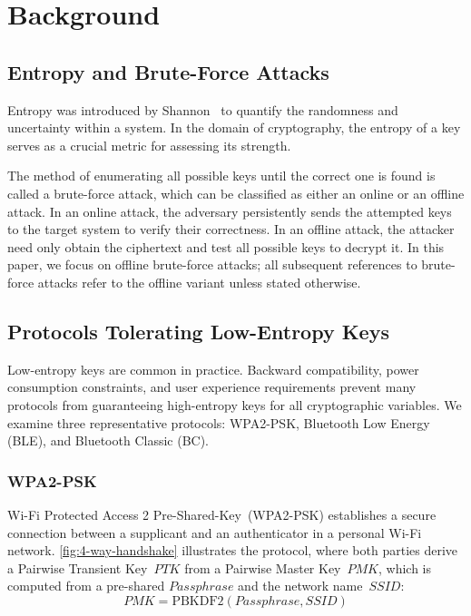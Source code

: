 \section{Background} \label{sec:2background}

\subsection{Entropy and Brute-Force Attacks}

Entropy was introduced by Shannon~\cite{shannon1948communicationtheory} to quantify the randomness and uncertainty within a system.
In the domain of cryptography, the entropy of a key serves as a crucial metric for assessing its strength.

The method of enumerating all possible keys until the correct one is found is called a brute-force attack, which can be classified as either an online or an offline attack.
In an online attack, the adversary persistently sends the attempted keys to the target system to verify their correctness.
In an offline attack, the attacker need only obtain the ciphertext and test all possible keys to decrypt it.
In this paper, we focus on offline brute-force attacks; all subsequent references to brute-force attacks refer to the offline variant unless stated otherwise.

\subsection{Protocols Tolerating Low-Entropy Keys}
Low-entropy keys are common in practice.
Backward compatibility, power consumption constraints, and user experience requirements prevent many protocols from guaranteeing high-entropy keys for all cryptographic variables.
We examine three representative protocols: WPA2-PSK, Bluetooth Low Energy (BLE), and Bluetooth Classic (BC).

\subsubsection{WPA2-PSK}
Wi-Fi Protected Access 2 Pre-Shared-Key~(WPA2-PSK) establishes a secure connection between a supplicant and an authenticator in a personal Wi-Fi network.
\autoref{fig:4-way-handshake} illustrates the protocol, where both parties derive a Pairwise Transient Key~$PTK$ from a Pairwise Master Key~$PMK$, which is computed from a pre-shared $Passphrase$ and the network name~$SSID$:
\begin{equation} \label{eq:pmk}
    PMK = \text{PBKDF2}(Passphrase, SSID)
\end{equation}

